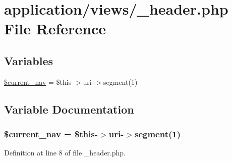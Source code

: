 \hypertarget{__header_8php}{\section{application/views/\-\_\-header.php File Reference}
\label{__header_8php}
}
\subsection*{Variables}
\begin{DoxyCompactItemize}
\item 
\hyperlink{__header_8php_a1749e55bf76bb75e2d28394d4aa592f0}{\$current\-\_\-nav} = \$this-\/$>$uri-\/$>$segment(1)
\end{DoxyCompactItemize}


\subsection{Variable Documentation}
\hypertarget{__header_8php_a1749e55bf76bb75e2d28394d4aa592f0}{
\subsubsection[{\$current\-\_\-nav}]{\setlength{\rightskip}{0pt plus 5cm}\$current\-\_\-nav = \$this-\/$>$uri-\/$>$segment(1)}}\label{__header_8php_a1749e55bf76bb75e2d28394d4aa592f0}


Definition at line 8 of file \-\_\-header.\-php.

